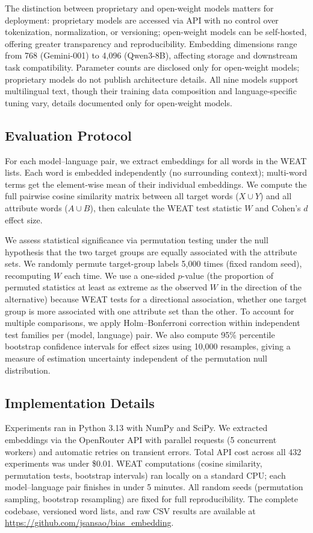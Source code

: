 \documentclass{sbc2019}
\begin{document}
The distinction between proprietary and open-weight models matters for deployment: proprietary models are accessed via API with no control over tokenization, normalization, or versioning; open-weight models can be self-hosted, offering greater transparency and reproducibility. Embedding dimensions range from 768 (Gemini-001) to 4,096 (Qwen3-8B), affecting storage and downstream task compatibility. Parameter counts are disclosed only for open-weight models; proprietary models do not publish architecture details. All nine models support multilingual text, though their training data composition and language-specific tuning vary, details documented only for open-weight models.

\subsection{Evaluation Protocol}

For each model--language pair, we extract embeddings for all words in the WEAT lists. Each word is embedded independently (no surrounding context); multi-word terms get the element-wise mean of their individual embeddings. We compute the full pairwise cosine similarity matrix between all target words ($X \cup Y$) and all attribute words ($A \cup B$), then calculate the WEAT test statistic $W$ and Cohen's $d$ effect size.

We assess statistical significance via permutation testing under the null hypothesis that the two target groups are equally associated with the attribute sets. We randomly permute target-group labels 5,000 times (fixed random seed), recomputing $W$ each time. We use a one-sided $p$-value (the proportion of permuted statistics at least as extreme as the observed $W$ in the direction of the alternative) because WEAT tests for a directional association, whether one target group is more associated with one attribute set than the other. To account for multiple comparisons, we apply Holm--Bonferroni correction within independent test families per (model, language) pair. We also compute 95\% percentile bootstrap confidence intervals for effect sizes using 10,000 resamples, giving a measure of estimation uncertainty independent of the permutation null distribution.

\subsection{Implementation Details}

Experiments ran in Python 3.13 with NumPy and SciPy. We extracted embeddings via the OpenRouter API with parallel requests (5 concurrent workers) and automatic retries on transient errors. Total API cost across all 432 experiments was under \$0.01. WEAT computations (cosine similarity, permutation tests, bootstrap intervals) ran locally on a standard CPU; each model--language pair finishes in under 5 minutes. All random seeds (permutation sampling, bootstrap resampling) are fixed for full reproducibility. The complete codebase, versioned word lists, and raw CSV results are available at \url{https://github.com/jsansao/bias\_embedding}.
\end{document}

